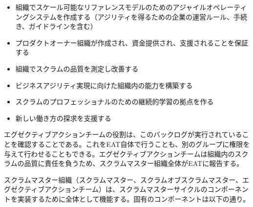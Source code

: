 \documentclass[12pt,a4paper,parskip=full]{scrartcl}
\begin{document}
\begin{itemize}
\itemsep1pt\parskip0pt

\item
組織でスケール可能なリファレンスモデルのためのアジャイルオペレーティングシステムを作成する（アジリティを得るための企業の運営ルール、手続き、ガイドラインを含む）
\item
プロダクトオーナー組織が作成され、資金提供され、支援されることを保証する
\item
組織でスクラムの品質を測定し改善する
\item
ビジネスアジリティ実現に向けた組織内の能力を構築する
\item
スクラムのプロフェッショナルのための継続的学習の拠点を作る
\item
新しい働き方の探求を支援する
\end{itemize}

エグゼクティブアクションチームの役割は、このバックログが実行されていることを確認することである。これをEAT自体で行うことも、別のグループに権限を与えて行わせることもできる。エグゼクティブアクションチームは組織内のスクラムの品質に責任を負うため、スクラムマスター組織全体がEATに報告する。

スクラムマスター組織（スクラムマスター、スクラムオブスクラムマスター、エグゼクティブアクションチーム）は、スクラムマスターサイクルのコンポーネントを実装するために全体として機能する。固有のコンポーネントは以下の通り。
\end{document}
